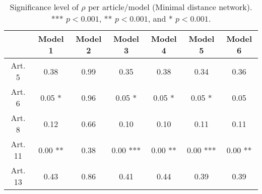 \begin{table}[ht]
\centering
\begin{tabular}{ccccccc}
  \toprule
 & Model 1 & Model 2 & Model 3 & Model 4 & Model 5 & Model 6 \\ 
  \midrule
Art. 5 & 0.38   & 0.99   & 0.35   & 0.38   & 0.34   & 0.36   \\ 
   \midrule
Art. 6 & 0.05 * & 0.96   & 0.05 * & 0.05 * & 0.05 * & 0.05   \\ 
   \midrule
Art. 8 & 0.12   & 0.66   & 0.10   & 0.10   & 0.11   & 0.11   \\ 
   \midrule
Art. 11 & 0.00 ** & 0.38   & 0.00 *** & 0.00 ** & 0.00 *** & 0.00 ** \\ 
   \midrule
Art. 13 & 0.43   & 0.86   & 0.41   & 0.44   & 0.39   & 0.39   \\ 
   \bottomrule
\end{tabular}
\caption{Significance level of $\rho$ per article/model (Minimal distance network). *** $p < 0.001$, ** $p < 0.001$, and * $p < 0.001$.} 
\end{table}
